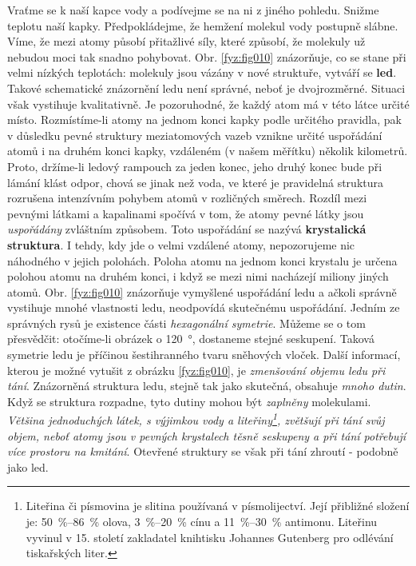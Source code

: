     Vraťme se k naší kapce vody a podívejme se na ni z jiného pohledu. Snižme teplotu naší kapky.
    Předpokládejme, že hemžení molekul vody postupně slábne. Víme, že mezi atomy působí přitažlivé
    síly, které způsobí, že molekuly už nebudou moci tak snadno pohybovat. Obr. \ref{fyz:fig010}
    znázorňuje, co se stane při velmi nízkých teplotách: molekuly jsou vázány v nové struktuře,
    vytváří se \textbf{led}. Takové schematické znázornění ledu není správné, neboť je dvojrozměrné.
    Situaci však vystihuje kvalitativně. Je pozoruhodné, že každý atom má v této látce určité místo.
    Rozmístíme-li atomy na jednom konci kapky podle určitého pravidla, pak v důsledku pevné
    struktury meziatomových vazeb vznikne určité uspořádání atomů i na druhém konci kapky, vzdáleném
    (v našem měřítku) několik kilometrů. Proto, držíme-li ledový rampouch za jeden konec, jeho druhý
    konec bude při lámání klást odpor, chová se jinak než voda, ve které je pravidelná struktura
    rozrušena intenzívním pohybem atomů v rozličných směrech. Rozdíl mezi pevnými látkami a
    kapalinami spočívá v tom, že atomy pevné látky jsou \emph{uspořádány} zvláštním způsobem. Toto
    uspořádání se nazývá \textbf{krystalická struktura}. I tehdy, kdy jde o velmi vzdálené atomy,
    nepozorujeme nic náhodného v jejich polohách. Poloha atomu na jednom konci krystalu je určena
    polohou atomu na druhém konci, i když se mezi nimi nacházejí miliony jiných atomů. Obr.
    \ref{fyz:fig010} znázorňuje vymyšlené uspořádání ledu a ačkoli správně vystihuje mnohé
    vlastnosti ledu, neodpovídá skutečnému uspořádání. Jedním ze správných rysů je existence části
    \emph{hexagonální symetrie}. Můžeme se o tom přesvědčit: otočíme-li obrázek o \SI{120}{\degree},
    dostaneme stejné seskupení. Taková symetrie ledu je příčinou šestihranného tvaru sněhových
    vloček. Další informací, kterou je možné vytušit z obrázku \ref{fyz:fig010}, je \emph{zmenšování
    objemu ledu při tání}. Znázorněná struktura ledu, stejně tak jako skutečná, obsahuje \emph{mnoho
    dutin}. Když se struktura rozpadne, tyto dutiny mohou být \emph{zaplněny} molekulami.
    \emph{Většina jednoduchých látek, s výjimkou vody a liteřiny\footnote{Liteřina či písmovina je
    slitina používaná v písmolijectví. Její přibližné složení je: \SIrange{50}{86}{\percent} olova,
    \SIrange{3}{20}{\percent} cínu a \SIrange{11}{30}{\percent} antimonu. Liteřinu vyvinul v 15.
    století zakladatel knihtisku Johannes Gutenberg pro odlévání tiskařských liter.}, zvětšují při
    tání svůj objem, neboť atomy jsou v pevných krystalech těsně seskupeny a při tání potřebují více
    prostoru na kmitání}. Otevřené struktury se však při tání zhroutí - podobně jako led.
    
